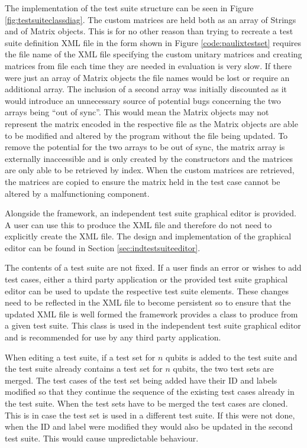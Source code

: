 The implementation of the test suite structure can be seen in Figure \ref{fig:testsuiteclassdiag}.
The custom matrices are held both as an array of Strings and of Matrix objects.
This is for no other reason than trying to recreate a test suite definition XML file in the form shown in Figure \ref{code:paulixtestset} requires the file name of the XML file specifying the custom unitary matrices and creating matrices from file each time they are needed in evaluation is very slow.
If there were just an array of Matrix objects the file names would be lost or require an additional array.
The inclusion of a second array was initially discounted as it would introduce an unnecessary source of potential bugs concerning the two arrays being ``out of sync''.
This would mean the Matrix objects may not represent the matrix encoded in the respective file as the Matrix objects are able to be modified and altered by the program without the file being updated.
To remove the potential for the two arrays to be out of sync, the matrix array is externally inaccessible and is only created by the constructors and the matrices are only able to be retrieved by index.
When the custom matrices are retrieved, the matrices are copied to ensure the matrix held in the test case cannot be altered by a malfunctioning component.

Alongside the framework, an independent test suite graphical editor is provided.
A user can use this to produce the XML file and therefore do not need to explicitly create the XML file.
The design and implementation of the graphical editor can be found in Section \ref{sec:indtestsuiteeditor}.

The contents of a test suite are not fixed.
If a user finds an error or wishes to add test cases, either a third party application or the provided test suite graphical editor can be used to update the respective test suite elements.
These changes need to be reflected in the XML file to become persistent so to ensure that the updated XML file is well formed the framework provides a class to produce from a given test suite.
This class is used in the independent test suite graphical editor and is recommended for use by any third party application.

When editing a test suite, if a test set for $n$ qubits is added to the test suite and the test suite already contains a test set for $n$ qubits, the two test sets are merged.
The test cases of the test set being added have their ID and labels modified so that they continue the sequence of the existing test cases already in the test suite.
When the test sets have to be merged the test cases are cloned.
This is in case the test set is used in a different test suite.
If this were not done, when the ID and label were modified they would also be updated in the second test suite.
This would cause unpredictable behaviour.

